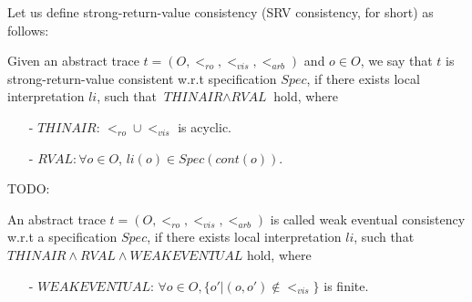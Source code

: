 Let us define strong-return-value consistency (SRV consistency, for short) as follows: 

\begin{definition}
\label{definition:strong return value consistency} 
Given an abstract trace $t = (O,<_{\textit{ro}},<_{\textit{vis}},<_{\textit{arb}})$ and $o \in O$, we say that $t$ is strong-return-value consistent w.r.t specification $Spec$, if there exists local interpretation $li$, such that $\textit{THINAIR} \wedge \textit{RVAL}$ hold, where

\begin{itemize}
\setlength{\itemsep}{0.5pt}
\item[-] $\textit{THINAIR}$: $<_{\textit{ro}} \cup <_{\textit{vis}}$ is acyclic. 

\item[-] $\textit{RVAL}: \forall o \in O$, $li(o) \in Spec(cont(o))$. 
\end{itemize} 
\end{definition}


{\color {blue}TODO: 

\begin{definition}
\label{definition:eventual consistency}
An abstract trace $t = (O,<_{\textit{ro}},<_{\textit{vis}},<_{\textit{arb}})$ is called weak eventual consistency w.r.t a specification $Spec$, if there exists local interpretation $li$, such that $\textit{THINAIR} \wedge \textit{RVAL} \wedge \textit{WEAKEVENTUAL}$ hold, where 

\begin{itemize}
\setlength{\itemsep}{0.5pt} 
\item[-] $\textit{WEAKEVENTUAL}$: $\forall o \in O, \{ o' \vert (o,o') \notin <_{\textit{vis}} \}$ is finite. 
\end{itemize} 
\end{definition}

}














